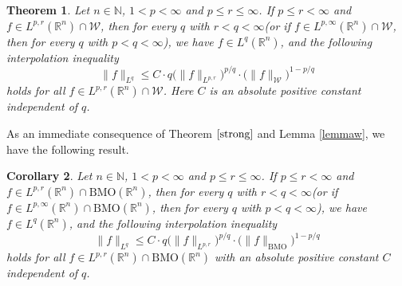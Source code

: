\documentclass{birkjour}
\newtheorem{thm}{Theorem}[section]
\newtheorem{cor}[thm]{Corollary}
\theoremstyle{definition}
\theoremstyle{remark}
\numberwithin{equation}{section}
\begin{document}
\begin{thm}\label{strong}
Let $n\in \mathbb{N}$, $1<p<\infty$ and $p\leq r\leq\infty$. If $p\leq r<\infty$ and $f\in L^{p,r}(\mathbb R^n)\cap \mathcal{W}$, then for every $q$ with $r<q<\infty$(or if $f\in L^{p,\infty}(\mathbb R^n)\cap \mathcal{W}$, then for every $q$ with $p<q<\infty$), we have $f\in L^q(\mathbb R^n)$, and the following interpolation inequality
\begin{equation*}
\|f\|_{L^q}\leq C\cdot q\big(\|f\|_{L^{p,r}}\big)^{p/q}\cdot\big(\|f\|_{\mathcal{W}}\big)^{1-p/q}
\end{equation*}
holds for all $f\in L^{p,r}(\mathbb R^n)\cap \mathcal{W}$. Here $C$ is an absolute positive constant independent of $q$.
\end{thm}

As an immediate consequence of Theorem $\ref{strong}$ and Lemma \ref{lemmaw}, we have the following result.
\begin{cor}\label{cor33}
Let $n\in \mathbb{N}$, $1<p<\infty$ and $p\leq r\leq\infty$. If $p\leq r<\infty$ and $f\in L^{p,r}(\mathbb R^n)\cap \mathrm{BMO}(\mathbb R^n)$, then for every $q$ with $r<q<\infty$(or if $f\in L^{p,\infty}(\mathbb R^n)\cap \mathrm{BMO}(\mathbb R^n)$, then for every $q$ with $p<q<\infty$), we have $f\in L^q(\mathbb R^n)$, and the following interpolation inequality
\begin{equation*}
\|f\|_{L^q}\leq C\cdot q\big(\|f\|_{L^{p,r}}\big)^{p/q}\cdot\big(\|f\|_{\mathrm{BMO}}\big)^{1-p/q}
\end{equation*}
holds for all $f\in L^{p,r}(\mathbb R^n)\cap \mathrm{BMO}(\mathbb R^n)$ with an absolute positive constant $C$ independent of $q$.
\end{cor}
\end{document}

